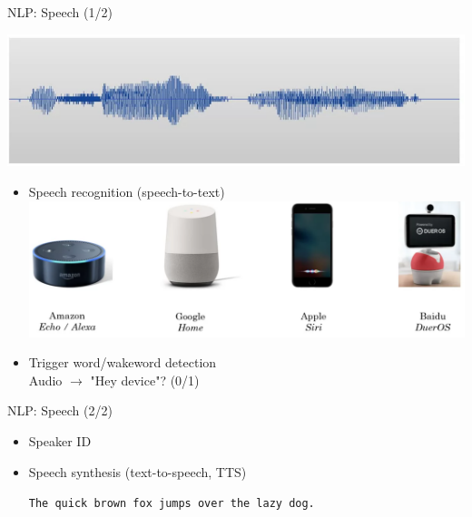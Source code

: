 \documentclass[pdf]{beamer}
\theoremstyle{mystyle}
\begin{document}
\begin{frame}{NLP: Speech (1/2)}
	\begin{center}
		\includegraphics[scale=.25]{speech-1}
	\end{center}
	\begin{itemize}
		\item Speech recognition (speech-to-text) \\
		\includegraphics[scale=.2]{smart-speakers}
		\item<2-> Trigger word/wakeword detection \\
		Audio $\longrightarrow$ "Hey device"? (0/1)
	\end{itemize}
\end{frame}

\begin{frame}{NLP: Speech (2/2)}
	\begin{itemize}
		\item Speaker ID

		\bigskip

		\item<2-> Speech synthesis (text-to-speech, TTS)
		\begin{center}
			\texttt{The quick brown fox jumps over the lazy dog.}	
		\end{center}						
	\end{itemize}
\end{frame}

\end{document}
